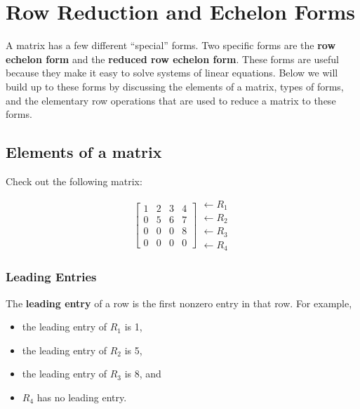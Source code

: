 \documentclass[
  letterpaper,
  DIV=11,
  numbers=noendperiod]{scrreprt}
\providecommand{\tightlist}{%
  \setlength{\itemsep}{0pt}\setlength{\parskip}{0pt}}\usepackage{longtable,booktabs,array}
\begin{document}

\hypertarget{row-reduction-and-echelon-forms}{%
\chapter{Row Reduction and Echelon
Forms}\label{row-reduction-and-echelon-forms}}

A matrix has a few different ``special'' forms. Two specific forms are
the \textbf{row echelon form} and the \textbf{reduced row echelon form}.
These forms are useful because they make it easy to solve systems of
linear equations. Below we will build up to these forms by discussing
the elements of a matrix, types of forms, and the elementary row
operations that are used to reduce a matrix to these forms.

\hypertarget{elements-of-a-matrix}{%
\section*{Elements of a matrix}\label{elements-of-a-matrix}}


Check out the following matrix:

\[
\left[\begin{array}{ccc}
    1 & 2 & 3 & 4 \\
    0 & 5 & 6 & 7 \\
    0 & 0 & 0 & 8 \\
    0 & 0 & 0 & 0
\end{array}\right]
\begin{array}{c}
    \leftarrow R_1 \\
    \leftarrow R_2 \\
    \leftarrow R_3 \\
    \leftarrow R_4
\end{array}
\]

\hypertarget{leading-entries}{%
\subsection*{Leading Entries}\label{leading-entries}}

The \textbf{leading entry} of a row is the first nonzero entry in that
row. For example,

\begin{itemize}
\tightlist
\item
  the leading entry of \(R_1\) is 1,
\item
  the leading entry of \(R_2\) is 5,\\
\item
  the leading entry of \(R_3\) is 8, and
\item
  \(R_4\) has no leading entry.
\end{itemize}
\end{document}
